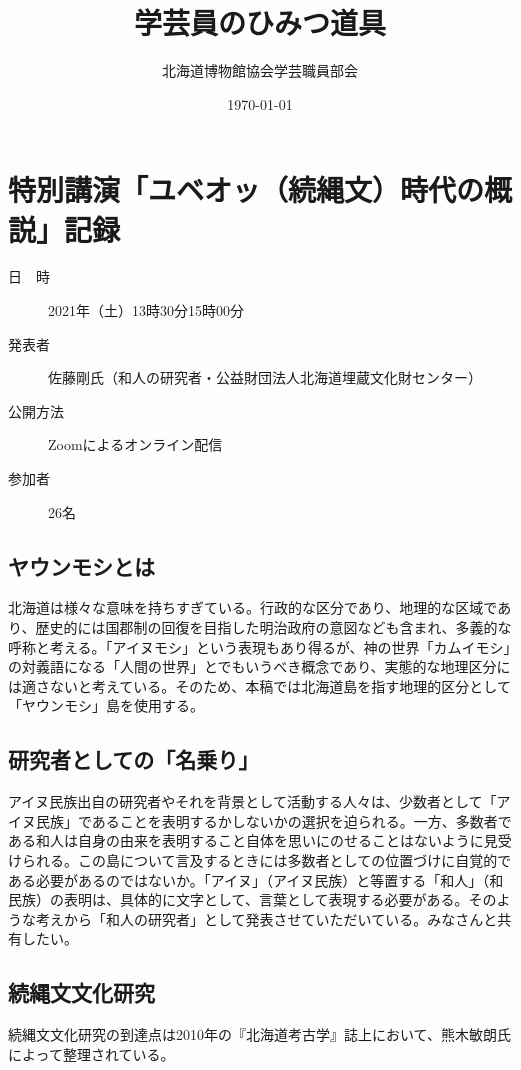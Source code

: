 \documentclass[a4j,11pt,twocolumn,openany]{jsbook}
\title{学芸員のひみつ道具}%
\date{\today}
\author{北海道博物館協会学芸職員部会}              %
\begin{document}
\frontmatter %

\tableofcontents

\mainmatter
\chapter{特別講演「ユベオッ（続縄文）時代の概説」記録}

\begin{description}
\item[日　時]2021年（土）13時30分15時00分
\item[発表者]佐藤剛氏（和人の研究者・公益財団法人北海道埋蔵文化財センター）
\item[公開方法]Zoomによるオンライン配信
\item[参加者]26名
\end{description}

\section{ヤウンモシとは}
北海道は様々な意味を持ちすぎている。行政的な区分であり、地理的な区域であり、歴史的には国郡制の回復を目指した明治政府の意図なども含まれ、多義的な呼称と考える。「アイヌモシ」という表現もあり得るが、神の世界「カムイモシ」の対義語になる「人間の世界」とでもいうべき概念であり、実態的な地理区分には適さないと考えている。そのため、本稿では北海道島を指す地理的区分として「ヤウンモシ」島を使用する。

\section{研究者としての「名乗り」}
アイヌ民族出自の研究者やそれを背景として活動する人々は、少数者として「アイヌ民族」であることを表明するかしないかの選択を迫られる。一方、多数者である和人は自身の由来を表明すること自体を思いにのせることはないように見受けられる。この島について言及するときには多数者としての位置づけに自覚的である必要があるのではないか。「アイヌ」（アイヌ民族）と等置する「和人」（和民族）の表明は、具体的に文字として、言葉として表現する必要がある。そのような考えから「和人の研究者」として発表させていただいている。みなさんと共有したい。

\section{続縄文文化研究}
続縄文文化研究の到達点は2010年の『北海道考古学』誌上において、熊木敏朗氏によって整理されている。
\end{document}
